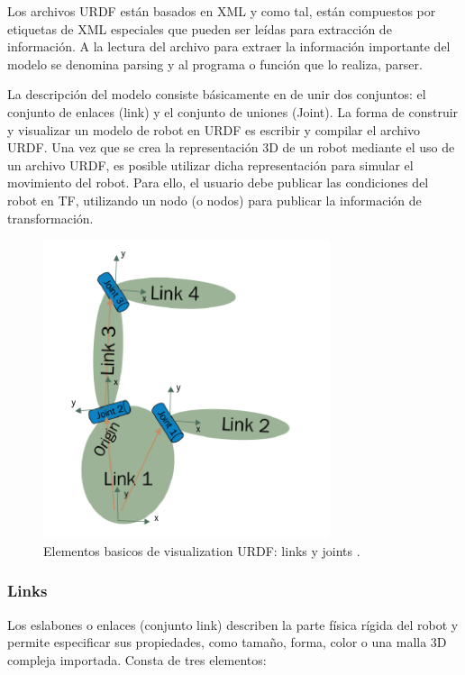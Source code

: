         Los archivos URDF están basados en XML y como tal, están compuestos por etiquetas de XML especiales que pueden ser leídas para extracción de información. A la lectura del archivo para extraer la información importante del modelo se denomina parsing y al programa o función que lo realiza, parser.
        
        La descripción del modelo consiste básicamente en de unir dos conjuntos: el conjunto de enlaces (link) y el conjunto de uniones (Joint). La forma de construir y visualizar un modelo de robot en URDF es escribir y compilar el archivo URDF. Una vez que se crea la representación 3D de un robot mediante el uso de un archivo URDF, es posible utilizar dicha representación para simular el movimiento del robot. Para ello, el usuario debe publicar las condiciones del robot en TF, utilizando un nodo (o nodos) para publicar la información de transformación.
        
        \begin{figure}[htb]
            \centering
            \includegraphics[width=0.55\linewidth]{Main/Chapter3/Images3/3-7/representacion-de-eslabon-en-urdf.png}
            \caption{Elementos basicos de visualization URDF: links y joints \cite{urdftutorials}.}
            \label{f:Cap3-7_eslabon_urdf}
        \end{figure} 
        
                                \newpage

        
        \subsubsection{Links}
        
        Los eslabones o enlaces (conjunto link) describen la parte física rígida del robot y permite especificar sus propiedades, como tamaño, forma, color o una malla 3D compleja importada. Consta de tres elementos:
    
